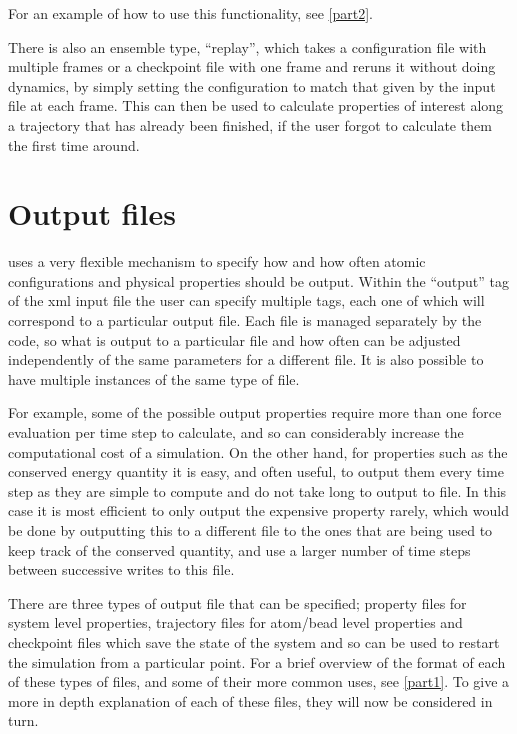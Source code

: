 \documentclass[11pt,english,fleqn]{report}
\begin{document}
For an example of how to use this functionality, see
\ref{part2}.

There is also an ensemble type, {}``replay'', which takes a configuration
file with multiple frames or a checkpoint file with one frame and
reruns it without doing dynamics, by simply setting the configuration
to match that given by the input file at each frame. This can then
be used to calculate properties of interest along a trajectory that
has already been finished, if the user forgot to calculate them the
first time around.


\section{Output files}

\label{outputfiles}

\ipi uses a very flexible mechanism to specify how and how often
atomic configurations and physical properties should be output. Within
the {}``output'' tag of the xml input file the user can specify
multiple tags, each one of which will correspond to a particular output
file. Each file is managed separately by the code, so what is output
to a particular file and how often can be adjusted independently of
the same parameters for a different file. It is also possible to have
multiple instances of the same type of file.

For example, some of the possible output properties require more than
one force evaluation per time step to calculate, and so can considerably
increase the computational cost of a simulation. On the other hand,
for properties such as the conserved energy quantity it is easy, and
often useful, to output them every time step as they are simple to
compute and do not take long to output to file. In this case it is
most efficient to only output the expensive property rarely, which
would be done by outputting this to a different file to the ones that
are being used to keep track of the conserved quantity, and use a
larger number of time steps between successive writes to this file.

There are three types of output file that can be specified; property
files for system level properties, trajectory files for atom/bead
level properties and checkpoint files which save the state of the
system and so can be used to restart the simulation from a particular
point. For a brief overview of the format of each of these types of
files, and some of their more common uses, see \ref{part1}.
To give a more in depth explanation of each of these files, 
they will now be considered in turn.
\end{document}
